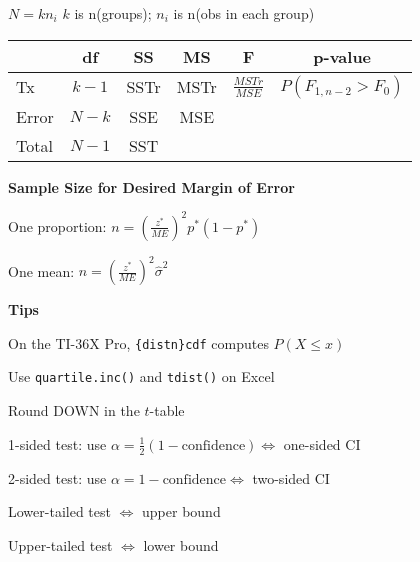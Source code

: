 \documentclass[twocolumn]{article}
\begin{document}
$N = k n_i$ \hfill $k$ is n(groups); $n_i$ is n(obs in each group)

\begin{table}[ht]
    \centering
    \begin{tabular}{lccccc}
        \toprule
        & df & SS & MS & F & p-value \\
        \midrule
        Tx & $k-1$ & SSTr & MSTr & $\textstyle\frac{MSTr}{MSE}$ & $P(F_{1,n-2} > F_0)$ \\
        Error & $N-k$ & SSE & MSE \\
        Total & $N-1$ & SST \\
        \bottomrule
    \end{tabular}
\end{table} \vspace{-.5em}

\dotfill

\textbf{Sample Size for Desired Margin of Error}

One proportion: $n = \left( \frac{z^*}{ME}\right)^2 p^* (1-p^*)$

One mean: $n = \left( \frac{z^*}{ME}\right)^2 \hat{\sigma}^2$

\dotfill

\textbf{Tips}

On the TI-36X Pro, \verb|{distn}cdf| computes $P(X \leq x)$

Use \texttt{quartile.inc()} and \texttt{tdist()} on Excel

Round DOWN in the $t$-table

1-sided test: use $\alpha = \frac{1}{2} (1 - \text{confidence}) \iff$ one-sided CI

2-sided test: use $\alpha = 1 - \text{confidence} \iff$ two-sided CI

Lower-tailed test $\iff$ upper bound

Upper-tailed test $\iff$ lower bound
\end{document}
